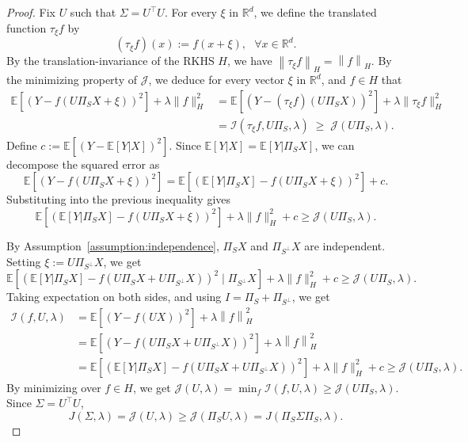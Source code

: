 \documentclass[sn-mathphys-num]{sn-jnl}%
\numberwithin{equation}{section}
\newcommand{\R}{\mathbb{R}}
\newcommand{\E}{\mathbb{E}}
\newcommand{\norm}[1]{\left\|{#1}\right\|} %
\theoremstyle{thmstyleone}%
\theoremstyle{thmstyletwo}%
\theoremstyle{thmstylethree}%
\begin{document}
\begin{proof} 
Fix $U$ such that $\Sigma = U^\top U$. 
For every $\xi$ in $\R^d$, we define the translated function $\tau_\xi f$ by
\begin{equation*}
	(\tau_\xi f)(x):= f(x+\xi),~~~\forall x \in \R^d.
\end{equation*}
By the translation-invariance of the RKHS $H$, we have $\norm{\tau_\xi f}_H = \norm{f}_H$. 
By the minimizing property of $\mathcal{J}$, we deduce for every vector $\xi$ in $\R^d$, and $f \in H$ that 
\begin{equation*}
\begin{aligned}
  \E[(Y - f(U\Pi_S X + \xi))^2] + \lambda \|f\|_H^2
   &= \E[(Y - (\tau_\xi f)(U\Pi_S X))^2] + \lambda \|\tau_\xi f\|_H^2 \\
   &= \mathcal{I}(\tau_\xi f, U\Pi_S, \lambda)
   \;\ge\; \mathcal{J}(U\Pi_S, \lambda).
\end{aligned}
\end{equation*}
Define $c := \E[(Y - \E[Y|X])^2]$. Since $\E[Y|X] = \E[Y|\Pi_S X]$, we can decompose the squared error as
\[
\E[(Y - f(U \Pi_{S} X + \xi))^2] = \E\left[(\E[Y|\Pi_{S} X] - f(U \Pi_{S} X + \xi))^2\right] + c.
\]
Substituting into the previous inequality gives
\[
\E\left[(\E[Y|\Pi_{S} X] - f(U \Pi_{S} X + \xi))^2\right] + \lambda \|f\|_H^2 + c \ge \mathcal{J}(U\Pi_S, \lambda).
\]

By Assumption~\ref{assumption:independence}, $\Pi_{S} X$ and $\Pi_{S^\perp} X$ are independent. Setting $\xi := U \Pi_{S^\perp} X$, we get
\[
  \E\left[(\E[Y|\Pi_{S} X] - f(U \Pi_{S} X + U\Pi_{S^\perp} X))^2 \mid  \Pi_{S^\perp} X\right] + \lambda \|f\|_H^2 + c \ge \mathcal{J}(U\Pi_S, \lambda).
\]
Taking expectation on both sides, and using $I = \Pi_{S} + \Pi_{S^\perp}$, we get 
\begin{equation*}
\begin{split} 
	\mathcal{I}(f, U, \lambda) 
		&=  \E[(Y - f( U X))^2] + \lambda \norm{f}_H^2  \\
		&= \E[(Y - f( U \Pi_{S} X + U \Pi_{S^\perp} X))^2] + \lambda \norm{f}_H^2 \\
		&=   \E\left[(\E[Y|\Pi_{S} X] - f(U \Pi_{S} X + U \Pi_{S^\perp} X))^2\right] + \lambda \|f\|_H^2 + c 
			\ge  \mathcal{J}(U\Pi_S, \lambda).
\end{split} 
\end{equation*}
By minimizing over $f \in H$, we get 
$\mathcal{J}(U, \lambda)= \min_f \mathcal{I}(f, U, \lambda)  \ge \mathcal{J}(U\Pi_S, \lambda)$. 
Since $\Sigma = U^\top U$, 
\begin{equation*} J(\Sigma,\lambda) = \mathcal{J}(U,\lambda) \ge \mathcal{J}(\Pi_S U,\lambda)
  = J(\Pi_S \Sigma \Pi_S,\lambda).
 \end{equation*} 


\end{proof}
\end{document}
